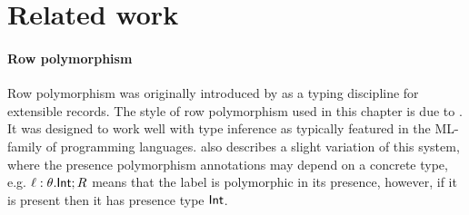\documentclass[12pt,phd,lfcs,twoside,openright,logo,leftchapter,normalheadings]{infthesis}
\theoremstyle{plain}
\theoremstyle{definition}
\begin{document}




\section{Related work}

\paragraph{Row polymorphism} Row polymorphism was originally
introduced by \citet{Wand87} as a typing discipline for extensible
records. The style of row polymorphism used in this chapter is due to
\citet{Remy94}. It was designed to work well with type inference as
typically featured in the ML-family of programming
languages. \citeauthor{Remy94} also describes a slight variation of
this system, where the presence polymorphism annotations may depend on
a concrete type, e.g. $\ell : \theta.\mathsf{Int};R$ means that the label is
polymorphic in its presence, however, if it is present then it has
presence type $\mathsf{Int}$.
\end{document}
